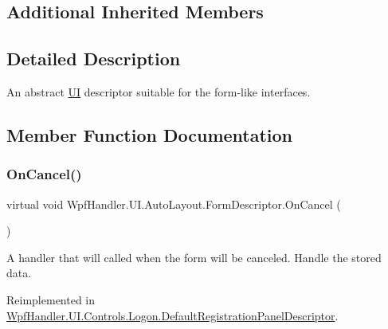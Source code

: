 \subsection*{Additional Inherited Members}


\subsection{Detailed Description}
An abstract \mbox{\hyperlink{namespace_wpf_handler_1_1_u_i}{UI}} descriptor suitable for the form-\/like interfaces. 



\subsection{Member Function Documentation}
\mbox{\label{class_wpf_handler_1_1_u_i_1_1_auto_layout_1_1_form_descriptor_a4bbe131238be232c253ca4c65e8493f4}} 
\subsubsection{\texorpdfstring{On\+Cancel()}{OnCancel()}}
{\footnotesize\ttfamily virtual void Wpf\+Handler.\+U\+I.\+Auto\+Layout.\+Form\+Descriptor.\+On\+Cancel (\begin{DoxyParamCaption}{ }\end{DoxyParamCaption})\hspace{0.3cm}{\ttfamily [virtual]}}



A handler that will called when the form will be canceled. Handle the stored data. 



Reimplemented in \mbox{\hyperlink{class_wpf_handler_1_1_u_i_1_1_controls_1_1_logon_1_1_default_registration_panel_descriptor_a9154a1e27afdf8d40da139042ee7e609}{Wpf\+Handler.\+U\+I.\+Controls.\+Logon.\+Default\+Registration\+Panel\+Descriptor}}.

\mbox{\label{class_wpf_handler_1_1_u_i_1_1_auto_layout_1_1_form_descriptor_ae2d4791e3085dba435c09b6082bd8408}} 
